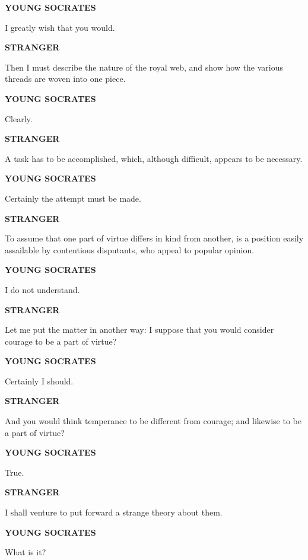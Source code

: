 \documentclass[11pt,letter]{article}
\begin{document}
\par \textbf{YOUNG SOCRATES}
\par   I greatly wish that you would.

\par \textbf{STRANGER}
\par   Then I must describe the nature of the royal web, and show how the various threads are woven into one piece.

\par \textbf{YOUNG SOCRATES}
\par   Clearly.

\par \textbf{STRANGER}
\par   A task has to be accomplished, which, although difficult, appears to be necessary.

\par \textbf{YOUNG SOCRATES}
\par   Certainly the attempt must be made.

\par \textbf{STRANGER}
\par   To assume that one part of virtue differs in kind from another, is a position easily assailable by contentious disputants, who appeal to popular opinion.

\par \textbf{YOUNG SOCRATES}
\par   I do not understand.

\par \textbf{STRANGER}
\par   Let me put the matter in another way:  I suppose that you would consider courage to be a part of virtue?

\par \textbf{YOUNG SOCRATES}
\par   Certainly I should.

\par \textbf{STRANGER}
\par   And you would think temperance to be different from courage; and likewise to be a part of virtue?

\par \textbf{YOUNG SOCRATES}
\par   True.

\par \textbf{STRANGER}
\par   I shall venture to put forward a strange theory about them.

\par \textbf{YOUNG SOCRATES}
\par   What is it?
\end{document}
